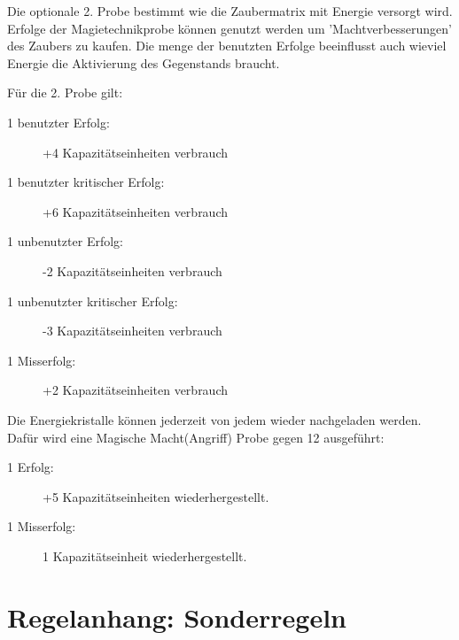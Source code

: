 Die optionale 2. Probe bestimmt wie die Zaubermatrix mit Energie versorgt wird. Erfolge der Magietechnikprobe können genutzt werden um 'Machtverbesserungen' des Zaubers zu kaufen. Die menge der benutzten Erfolge beeinflusst auch wieviel Energie die Aktivierung des Gegenstands braucht.

Für die 2. Probe gilt:
\begin{description}
\item[1 benutzter Erfolg:] +4 Kapazitätseinheiten verbrauch
\item[1 benutzter kritischer Erfolg:] +6 Kapazitätseinheiten verbrauch
\item[1 unbenutzter Erfolg:] -2 Kapazitätseinheiten verbrauch
\item[1 unbenutzter kritischer Erfolg:] -3 Kapazitätseinheiten verbrauch
\item[1 Misserfolg:] +2 Kapazitätseinheiten verbrauch
\end{description}

Die Energiekristalle können jederzeit von jedem wieder nachgeladen werden. Dafür wird eine Magische Macht(Angriff) Probe gegen 12 ausgeführt:
\begin{description}
\item[1 Erfolg:] +5 Kapazitätseinheiten wiederhergestellt.
\item[1 Misserfolg:] 1 Kapazitätseinheit wiederhergestellt.
\end{description}

\chapter{Regelanhang: Sonderregeln}
